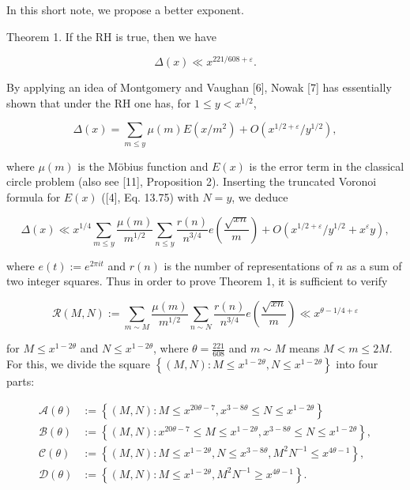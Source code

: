 \documentclass[10pt]{article}
\begin{document}
In this short note, we propose a better exponent.

Theorem 1. If the RH is true, then we have

$$
\Delta(x) \ll x^{221 / 608+\varepsilon} .
$$

By applying an idea of Montgomery and Vaughan [6], Nowak [7] has essentially shown that under the RH one has, for $1 \leqslant y<x^{1 / 2}$,

$$
\Delta(x)=\sum_{m \leqslant y} \mu(m) E\left(x / m^{2}\right)+O\left(x^{1 / 2+\varepsilon} / y^{1 / 2}\right),
$$

where $\mu(m)$ is the Möbius function and $E(x)$ is the error term in the classical circle problem (also see [11], Proposition 2). Inserting the truncated Voronoi formula for $E(x)$ ([4], Eq. 13.75) with $N=y$, we deduce

$$
\Delta(x) \ll x^{1 / 4} \sum_{m \leqslant y} \frac{\mu(m)}{m^{1 / 2}} \sum_{n \leqslant y} \frac{r(n)}{n^{3 / 4}} e\left(\frac{\sqrt{x n}}{m}\right)+O\left(x^{1 / 2+\varepsilon} / y^{1 / 2}+x^{\varepsilon} y\right),
$$

where $e(t):=e^{2 \pi i t}$ and $r(n)$ is the number of representations of $n$ as a sum of two integer squares. Thus in order to prove Theorem 1, it is sufficient to verify


\begin{equation*}
\mathscr{R}(M, N):=\sum_{m \sim M} \frac{\mu(m)}{m^{1 / 2}} \sum_{n \sim N} \frac{r(n)}{n^{3 / 4}} e\left(\frac{\sqrt{x n}}{m}\right) \ll x^{\theta-1 / 4+\varepsilon} \tag{1.3}
\end{equation*}


for $M \leqslant x^{1-2 \theta}$ and $N \leqslant x^{1-2 \theta}$, where $\theta=\frac{221}{608}$ and $m \sim M$ means $M<m \leqslant 2 M$. For this, we divide the square $\left\{(M, N): M \leqslant x^{1-2 \theta}, N \leqslant x^{1-2 \theta}\right\}$ into four parts:

$$
\begin{aligned}
\mathscr{A}(\theta) & :=\left\{(M, N): M \leqslant x^{20 \theta-7}, x^{3-8 \theta} \leqslant N \leqslant x^{1-2 \theta}\right\} \\
\mathscr{B}(\theta) & :=\left\{(M, N): x^{20 \theta-7} \leqslant M \leqslant x^{1-2 \theta}, x^{3-8 \theta} \leqslant N \leqslant x^{1-2 \theta}\right\}, \\
\mathscr{C}(\theta) & :=\left\{(M, N): M \leqslant x^{1-2 \theta}, N \leqslant x^{3-8 \theta}, M^{2} N^{-1} \leqslant x^{4 \theta-1}\right\}, \\
\mathscr{D}(\theta) & :=\left\{(M, N): M \leqslant x^{1-2 \theta}, M^{2} N^{-1} \geqslant x^{4 \theta-1}\right\} .
\end{aligned}
$$
\end{document}
